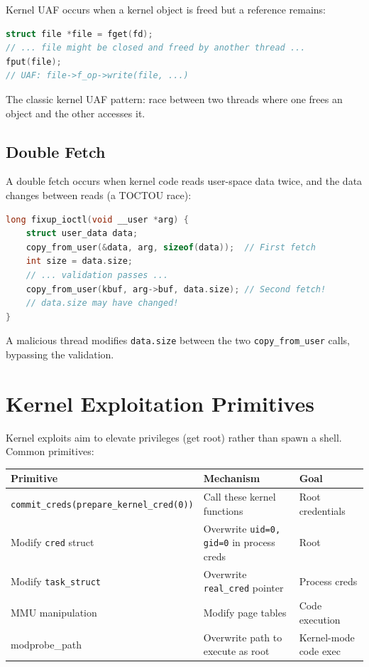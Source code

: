 Kernel UAF occurs when a kernel object is freed but a reference remains:

\begin{lstlisting}[language=C, caption=Kernel use-after-free]
struct file *file = fget(fd);
// ... file might be closed and freed by another thread ...
fput(file);
// UAF: file->f_op->write(file, ...)
\end{lstlisting}

The classic kernel UAF pattern: race between two threads where one frees an object and the other accesses it.

\subsection{Double Fetch}

A double fetch occurs when kernel code reads user-space data twice, and the data changes between reads (a TOCTOU race):

\begin{lstlisting}[language=C, caption=Double fetch vulnerability]
long fixup_ioctl(void __user *arg) {
    struct user_data data;
    copy_from_user(&data, arg, sizeof(data));  // First fetch
    int size = data.size;
    // ... validation passes ...
    copy_from_user(kbuf, arg->buf, data.size); // Second fetch!
    // data.size may have changed!
}
\end{lstlisting}

A malicious thread modifies \texttt{data.size} between the two \texttt{copy\_from\_user} calls, bypassing the validation.

\section{Kernel Exploitation Primitives}

Kernel exploits aim to elevate privileges (get root) rather than spawn a shell. Common primitives:

\begin{longtable}{p{3.5cm}p{5cm}p{4cm}}
	\toprule
	\textbf{Primitive}                               & \textbf{Mechanism}                               & \textbf{Goal}         \\
	\midrule
	\texttt{commit\_creds(prepare\_kernel\_cred(0))} & Call these kernel functions                      & Root credentials      \\
	Modify \texttt{cred} struct                      & Overwrite \texttt{uid=0, gid=0} in process creds & Root                  \\
	Modify \texttt{task\_struct}                     & Overwrite \texttt{real\_cred} pointer            & Process creds         \\
	MMU manipulation                                 & Modify page tables                               & Code execution        \\
	modprobe\_path                                   & Overwrite path to execute as root                & Kernel-mode code exec \\
	\bottomrule
\end{longtable}

